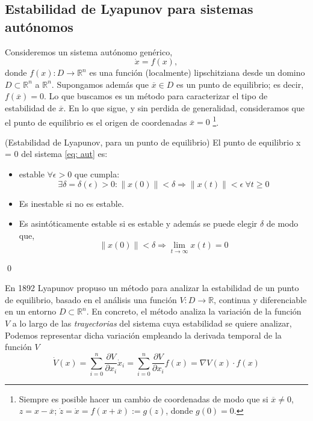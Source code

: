 \subsection{Estabilidad de Lyapunov para sistemas autónomos}
Consideremos un sistema autónomo genérico,
\begin{equation}\label{eq: aut}
\dot x = f(x),
\end{equation}
donde $f(x): D\rightarrow \mathbb{R}^n$ es una función (localmente) lipschitziana desde un domino $D \subset \mathbb{R}^n$ a $\mathbb{R}^n$. Supongamos además que $\overline x \in D$ es un punto de equilibrio; es decir, $f(\overline x) = 0$. Lo que buscamos es un método para caracterizar el tipo de estabilidad de $\overline x$. En lo que sigue, y sin perdida de generalidad, consideramos que el punto de equilibrio es el origen de coordenadas $\overline x = 0$ \footnote{Siempre es posible hacer un cambio de coordenadas de modo que si $\overline x \neq 0$, $z = x-\overline x$; $\dot z = \dot x = f(x+\overline x) := g(z)$, donde $g(0)=0$.}.

\begin{definition} (Estabilidad de Lyapunov, para un punto de equilibrio)\label{def: est}
El punto de equilibrio x = 0 del sistema \ref{eq: aut} es:
\begin{itemize}
\item estable $\forall \epsilon > 0$ que cumpla:
\begin{equation*}
 \exists \delta =\delta(\epsilon)>0: \| x(0) \| < \delta \Rightarrow \| x(t)\| < \epsilon \ \forall t \ge 0
\end{equation*}
 
 \item Es inestable si no es estable.
 \item Es asintóticamente estable si es estable y además se puede elegir $\delta$ de modo que,
\begin{equation*}
\| x(0)\| < \delta \Rightarrow \lim_{t \to \infty} x(t) = 0
\end{equation*}
\end{itemize}
\qed
\end{definition}

En 1892 Lyapunov propuso un método para analizar la estabilidad de un punto de equilibrio, basado en el análisis  una función $V:D\to \mathbb{R}$, continua y diferenciable en un entorno $D \subset \mathbb{R}^n$. En concreto, el método analiza la variación de la función $V$ a lo largo de las \emph{trayectorias} del sistema cuya estabilidad se quiere analizar, Podemos representar dicha variación empleando la derivada temporal de la función $V$
\begin{equation} \label{eq: dlyap}
\dot V(x) = \sum_{i=0}^{n}\frac{\partial V}{\partial x_i} \dot x_i = \sum_{i=0}^{n}\frac{\partial V}{\partial x_i} f(x) = \nabla V(x)\cdot f(x)
\end{equation}

